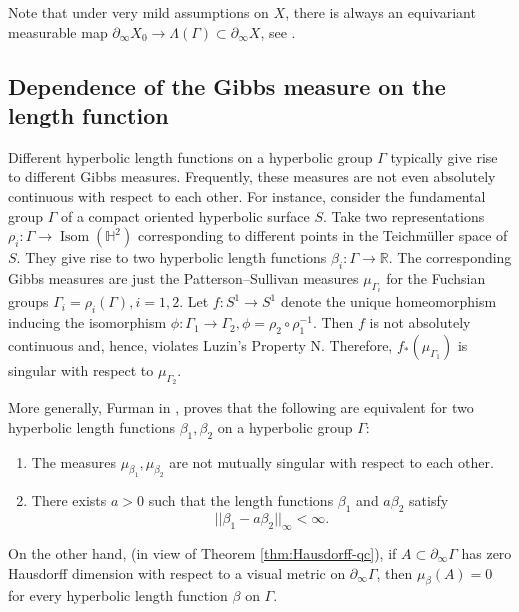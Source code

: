 \documentclass[12pt]{amsbook}%
\theoremstyle{definition}
\newtheorem{question}[thm]{Question}
\theoremstyle{remark}
\numberwithin{section}{chapter}
\numberwithin{subsection}{section}
\numberwithin{figure}{chapter}
\DeclareMathOperator{\Isom}{Isom}
\def\bR{{\mathbb{R}}}
\def\bH{{\mathbb{H}}}
\def\Ga{\Gamma}
\def\La{\Lambda}
\def\geo{\partial_\infty}
\begin{document}
{{%

Note that under very mild assumptions on $X$, there is always an equivariant measurable map $\geo X_0\to \La(\Ga)\subset \geo X$, see \cite{Monod-Shalom}. 



\subsection{Dependence of the Gibbs measure on the length function}

Different hyperbolic length functions on a hyperbolic group $\Ga$ typically give rise to different Gibbs measures. Frequently, these measures are not even absolutely continuous with respect to each other. For instance, consider the fundamental group $\Ga$ of a compact oriented hyperbolic surface $S$. Take two representations 
$\rho_i: \Ga\to \Isom(\bH^2)$ corresponding to different points in the Teichm\"uller space of $S$. They give rise to two hyperbolic length functions $\beta_i: \Ga\to \bR$. 
The corresponding Gibbs measures are just the Patterson--Sullivan measures $\mu_{\Ga_i}$ for the Fuchsian groups $\Ga_i=\rho_i(\Ga), i=1,2$. Let $f: S^1\to S^1$ denote the unique homeomorphism inducing the isomorphism $\phi: \Ga_1\to \Ga_2, \phi=\rho_2\circ \rho_1^{-1}$. Then $f$ is not absolutely continuous and, hence, violates Luzin's Property N. Therefore, $f_*(\mu_{\Ga_1})$ is singular with respect to $\mu_{\Ga_2}$. 

More generally, Furman in \cite[Theorem 2]{Furman},  proves that the following are equivalent for two hyperbolic length 
functions $\beta_1, \beta_2$ on  a hyperbolic group $\Ga$:

\begin{enumerate}
\item The measures $\mu_{\beta_1}, \mu_{\beta_2}$ are not mutually singular with respect to each other. 

\item There exists $a>0$ such that the length functions $\beta_1$ and $a\beta_2$ satisfy
$$
||\beta_1- a\beta_2||_{\infty}<\infty.$$
\end{enumerate}

On the other hand, (in view of Theorem \ref{thm:Hausdorff-qc}), if  $A\subset \geo \Ga$ has zero Hausdorff dimension with respect to a visual metric on $\geo \Ga$, then $\mu_{\beta}(A)=0$ for every hyperbolic length function $\beta$ on $\Ga$. 

}}
\end{document}
